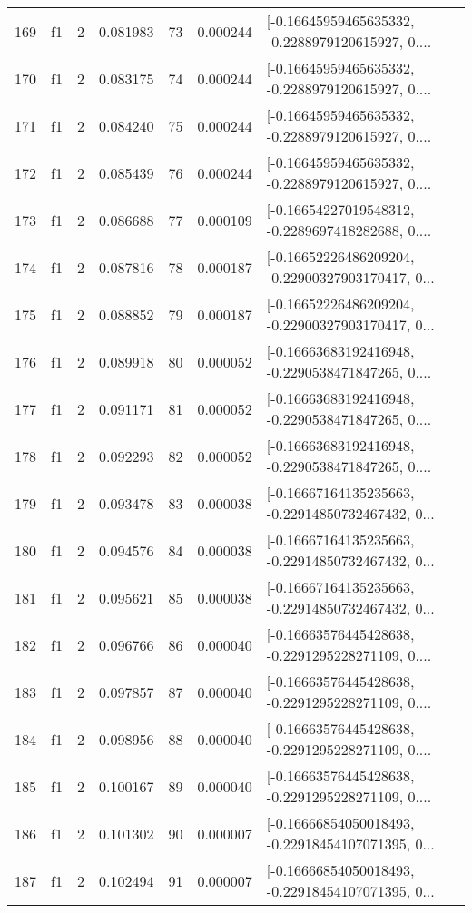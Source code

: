 \begin{tabular}{lllrlrl}
169 &  f1 &   2 &  0.081983 &   73 &  0.000244 &  [-0.16645959465635332, -0.2288979120615927, 0.... \\
170 &  f1 &   2 &  0.083175 &   74 &  0.000244 &  [-0.16645959465635332, -0.2288979120615927, 0.... \\
171 &  f1 &   2 &  0.084240 &   75 &  0.000244 &  [-0.16645959465635332, -0.2288979120615927, 0.... \\
172 &  f1 &   2 &  0.085439 &   76 &  0.000244 &  [-0.16645959465635332, -0.2288979120615927, 0.... \\
173 &  f1 &   2 &  0.086688 &   77 &  0.000109 &  [-0.16654227019548312, -0.2289697418282688, 0.... \\
174 &  f1 &   2 &  0.087816 &   78 &  0.000187 &  [-0.16652226486209204, -0.22900327903170417, 0... \\
175 &  f1 &   2 &  0.088852 &   79 &  0.000187 &  [-0.16652226486209204, -0.22900327903170417, 0... \\
176 &  f1 &   2 &  0.089918 &   80 &  0.000052 &  [-0.16663683192416948, -0.2290538471847265, 0.... \\
177 &  f1 &   2 &  0.091171 &   81 &  0.000052 &  [-0.16663683192416948, -0.2290538471847265, 0.... \\
178 &  f1 &   2 &  0.092293 &   82 &  0.000052 &  [-0.16663683192416948, -0.2290538471847265, 0.... \\
179 &  f1 &   2 &  0.093478 &   83 &  0.000038 &  [-0.16667164135235663, -0.22914850732467432, 0... \\
180 &  f1 &   2 &  0.094576 &   84 &  0.000038 &  [-0.16667164135235663, -0.22914850732467432, 0... \\
181 &  f1 &   2 &  0.095621 &   85 &  0.000038 &  [-0.16667164135235663, -0.22914850732467432, 0... \\
182 &  f1 &   2 &  0.096766 &   86 &  0.000040 &  [-0.16663576445428638, -0.2291295228271109, 0.... \\
183 &  f1 &   2 &  0.097857 &   87 &  0.000040 &  [-0.16663576445428638, -0.2291295228271109, 0.... \\
184 &  f1 &   2 &  0.098956 &   88 &  0.000040 &  [-0.16663576445428638, -0.2291295228271109, 0.... \\
185 &  f1 &   2 &  0.100167 &   89 &  0.000040 &  [-0.16663576445428638, -0.2291295228271109, 0.... \\
186 &  f1 &   2 &  0.101302 &   90 &  0.000007 &  [-0.16666854050018493, -0.22918454107071395, 0... \\
187 &  f1 &   2 &  0.102494 &   91 &  0.000007 &  [-0.16666854050018493, -0.22918454107071395, 0... \\

\end{tabular}
